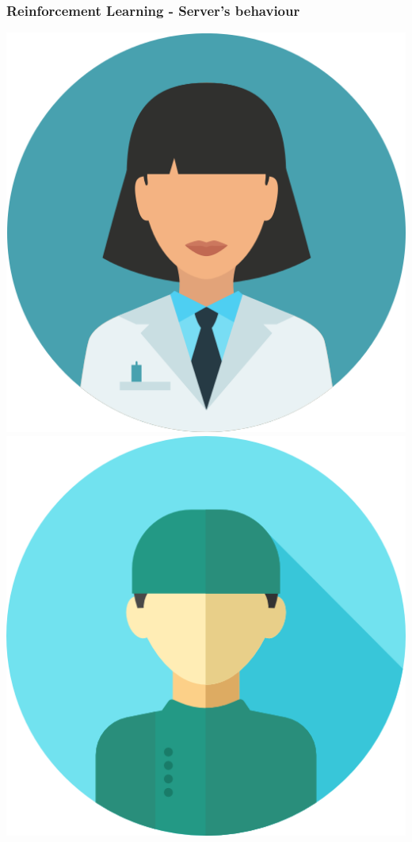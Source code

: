 \begin{frame}
    \frametitle{Reinforcement Learning - Server's behaviour}
    \centering

    \includegraphics[scale=0.08]{Bin/cartoon_pics/doctor_1.png}
    \hspace{0.4cm}
    \includegraphics[scale=0.1]{Bin/cartoon_pics/doctor_2.png}

\end{frame}
